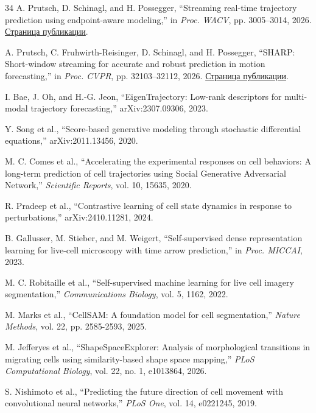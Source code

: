 \documentclass[11pt,a4paper]{article}
\begin{document}
\begin{thebibliography}{34}
 A. Prutsch, D. Schinagl, and H. Possegger, “Streaming real-time trajectory prediction using endpoint-aware modeling,” in \textit{Proc. WACV}, pp. 3005--3014, 2026. \href{https://openaccess.thecvf.com/content/WACV2026/html/Prutsch_Streaming_Real-Time_Trajectory_Prediction_Using_Endpoint-Aware_Modeling_WACV_2026_paper.html}{Страница публикации}.

 A. Prutsch, C. Fruhwirth-Reisinger, D. Schinagl, and H. Possegger, “SHARP: Short-window streaming for accurate and robust prediction in motion forecasting,” in \textit{Proc. CVPR}, pp. 32103--32112, 2026. \href{https://openaccess.thecvf.com/content/CVPR2026/html/Prutsch_SHARP_Short-Window_Streaming_for_Accurate_and_Robust_Prediction_in_Motion_CVPR_2026_paper.html}{Страница публикации}.

 I. Bae, J. Oh, and H.-G. Jeon, “EigenTrajectory: Low-rank descriptors for multi-modal trajectory forecasting,” arXiv:2307.09306, 2023.

 Y. Song et al., “Score-based generative modeling through stochastic differential equations,” arXiv:2011.13456, 2020.

 M. C. Comes et al., “Accelerating the experimental responses on cell behaviors: A long-term prediction of cell trajectories using Social Generative Adversarial Network,” \textit{Scientific Reports}, vol. 10, 15635, 2020.

 R. Pradeep et al., “Contrastive learning of cell state dynamics in response to perturbations,” arXiv:2410.11281, 2024.

 B. Gallusser, M. Stieber, and M. Weigert, “Self-supervised dense representation learning for live-cell microscopy with time arrow prediction,” in \textit{Proc. MICCAI}, 2023.

 M. C. Robitaille et al., “Self-supervised machine learning for live cell imagery segmentation,” \textit{Communications Biology}, vol. 5, 1162, 2022.

 M. Marks et al., “CellSAM: A foundation model for cell segmentation,” \textit{Nature Methods}, vol. 22, pp. 2585-2593, 2025.

 M. Jefferyes et al., “ShapeSpaceExplorer: Analysis of morphological transitions in migrating cells using similarity-based shape space mapping,” \textit{PLoS Computational Biology}, vol. 22, no. 1, e1013864, 2026.

 S. Nishimoto et al., “Predicting the future direction of cell movement with convolutional neural networks,” \textit{PLoS One}, vol. 14, e0221245, 2019.


\end{thebibliography}
\end{document}

